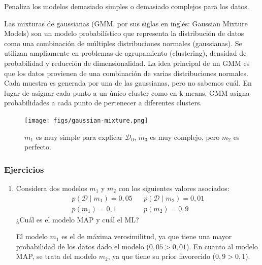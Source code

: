 Penaliza los modelos demasiado simples o demasiado complejos para los datos.

Las mixturas de gaussianas (GMM, por sus siglas en inglés: Gaussian Mixture Models) son un modelo probabilístico que representa la distribución de datos como una combinación de múltiples distribuciones normales (gaussianas). Se utilizan ampliamente en problemas de agrupamiento (clustering), densidad de probabilidad y reducción de dimensionalidad.
La idea principal de un GMM es que los datos provienen de una combinación de varias distribuciones normales. Cada muestra es generada por una de las gaussianas, pero no sabemos cuál. En lugar de asignar cada punto a un único cluster como en k-means, GMM asigna probabilidades a cada punto de pertenecer a diferentes clusters.

\begin{figure}[h]
\centering
\texttt{[image: figs/gaussian-mixture.png]}
\caption{$m_1$ es muy simple para explicar $\mathcal{D}_0$, $m_3$ es muy complejo, pero $m_2$ es perfecto.}
\end{figure}

\subsubsection{Ejercicios}
\begin{enumerate}
\item Considera dos modelos $m_1$ y $m_2$ con los siguientes valores asociados:
\begin{align*}
p(\mathcal{D} \mid m_1) = 0,05 && p(\mathcal{D} \mid m_2) = 0,01  \\
p(m_1) = 0,1 && p(m_2) = 0,9
\end{align*}
¿Cuál es el modelo MAP y cuál el ML?

El modelo $m_1$ es el de máxima verosimilitud, ya que tiene una mayor probabilidad de los datos dado el modelo ($0,05 > 0,01$). En cuanto al modelo MAP, se trata del modelo $m_2$, ya que tiene su prior favorecido ($0,9 > 0,1$).
\end{enumerate}

